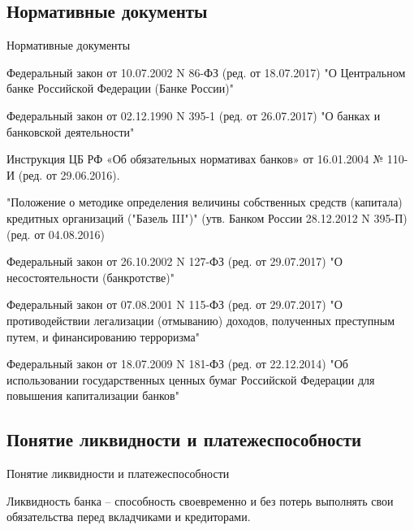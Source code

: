 \documentclass[_Banking_p2.tex]{subfiles}
\begin{document}

\subsection{Нормативные документы}

\begin{frame}[allowframebreaks]{Нормативные документы}
  \begin{thebibliography}{10}
  

Федеральный закон от 10.07.2002 N 86-ФЗ (ред. от 18.07.2017) "О Центральном банке Российской Федерации (Банке России)"

Федеральный закон от 02.12.1990 N 395-1 (ред. от 26.07.2017) "О банках и банковской деятельности"

\pagebreak

Инструкция ЦБ РФ «Об обязательных нормативах банков» от 16.01.2004 № 110-И (ред. от 29.06.2016).

"Положение о методике определения величины собственных средств (капитала) кредитных организаций ("Базель III")" (утв. Банком России 28.12.2012 N 395-П) (ред. от 04.08.2016)

Федеральный закон от 26.10.2002 N 127-ФЗ (ред. от 29.07.2017) "О несостоятельности (банкротстве)"

\pagebreak

Федеральный закон от 07.08.2001 N 115-ФЗ (ред. от 29.07.2017) "О противодействии легализации (отмыванию) доходов, полученных преступным путем, и финансированию терроризма"

Федеральный закон от 18.07.2009 N 181-ФЗ (ред. от 22.12.2014) "Об использовании государственных ценных бумаг Российской Федерации для повышения капитализации банков"

  \end{thebibliography}
\end{frame}


\subsection{Понятие ликвидности и платежеспособности}
\begin{frame}[shrink=10]{Понятие ликвидности и платежеспособности}{}
\begin{block}{Ликвидность банка }
\quad
– способность своевременно и без потерь выполнять свои обязательства перед вкладчиками и кредиторами.
\end{block}
\end{frame}
\end{document}
